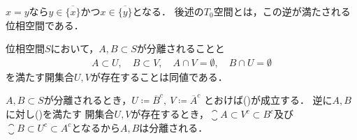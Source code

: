 	\begin{prf}
		$x = y$なら$y \in \overline{\{x\}}$かつ$x \in \overline{\{y\}}$となる．
		後述の$T_0$空間とは，この逆が満たされる位相空間である．
		\QED
	\end{prf}
	
	\begin{screen}
		\begin{thm}[分離される集合は他方を含まない近傍を持つ]
		\label{thm:the_equivalent_condition_of_separatedness}
			位相空間$S$において，$A,B \subset S$が分離されることと
			\begin{align}
				A \subset U,\quad B \subset V,\quad 
				A \cap V = \emptyset,
				\quad B \cap U = \emptyset
				\label{eq:thm_the_equivalent_condition_of_separatedness}
			\end{align}
			を満たす開集合$U,V$が存在することは同値である．
		\end{thm}
	\end{screen}
	
	\begin{prf}
		$A,B \subset S$が分離されるとき，$U \coloneqq \overline{B}^c,\ V \coloneqq \overline{A}^c$
		とおけば()が成立する．
		逆に$A,B$に対し()を満たす
		開集合$U,V$が存在するとき，$\closure{A} \subset V^c \subset B^c$及び
		$\closure{B} \subset U^c \subset A^c$となるから$A,B$は分離される．
		\QED
	\end{prf}
	
